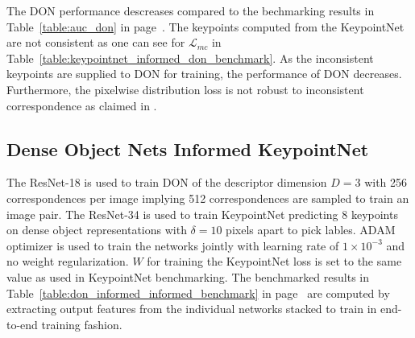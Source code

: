 The \ac{DON} performance descreases compared to the bechmarking results in Table~\ref{table:auc_don} in page~\pageref{table:auc_don}.
The keypoints computed from the KeypointNet are not consistent as one can see for $ \mathcal{L}_{mc}$ in Table~\ref{table:keypointnet_informed_don_benchmark}.
As the inconsistent keypoints are supplied to \ac{DON} for training, the performance of \ac{DON} decreases. Furthermore, the pixelwise
distribution loss is not robust to inconsistent correspondence as claimed in \cite{florence2020dense}.




























\subsection{Dense Object Nets Informed KeypointNet}

The \ac{ResNet}-18 is used to train \ac{DON} of the descriptor dimension $D=3$ with 256 correspondences per image implying 512 correspondences are sampled to train an image pair.
The \ac{ResNet}-34 is used to train KeypointNet predicting 8 keypoints on dense object representations with $\delta = 10$ pixels apart to pick lables.
ADAM optimizer is used to train the networks jointly with learning rate of $1 \times 10^{-3}$ and no weight regularization.
$W$ for training the KeypointNet loss is set to the same value as used in KeypointNet benchmarking. The benchmarked results in Table~\ref{table:don_informed_informed_benchmark} in page~\pageref{table:don_informed_informed_benchmark}
are computed by extracting output features from the individual networks stacked to train in end-to-end training fashion.

